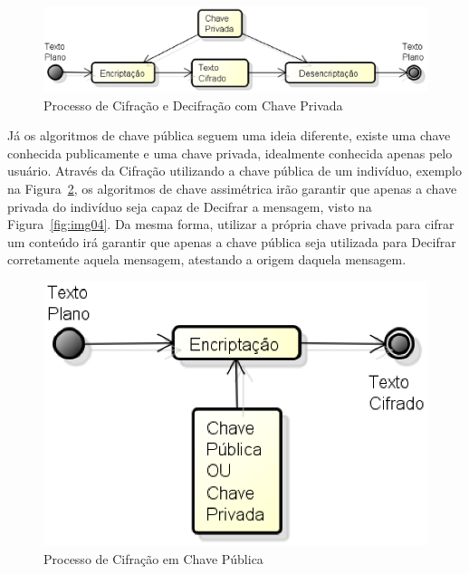 	\begin{figure}[h]
		\centering
		\includegraphics[keepaspectratio=true,scale=0.5]{figuras/img01.eps}
		\caption{Processo de Cifração e Decifração com Chave Privada}
		\label{fig:img02}
	\end{figure}

	Já os algoritmos de chave pública seguem uma ideia diferente, existe uma chave conhecida publicamente e uma chave privada, idealmente conhecida apenas pelo usuário. Através da Cifração utilizando a chave pública de um indivíduo, exemplo na Figura~\ref{fig:img03}, os algoritmos de chave assimétrica irão garantir que apenas a chave privada do indivíduo seja capaz de Decifrar a mensagem, visto na Figura~\ref{fig:img04}. Da mesma forma, utilizar a própria chave privada para cifrar um conteúdo irá garantir que apenas a chave pública seja utilizada para Decifrar corretamente aquela mensagem, atestando a origem daquela mensagem.

	\begin{figure}[!ht]
		\centering
		\includegraphics[keepaspectratio=true,scale=0.5]{figuras/encript.eps}
		\caption{Processo de Cifração em Chave Pública}
		\label{fig:img03}
	\end{figure}
	
